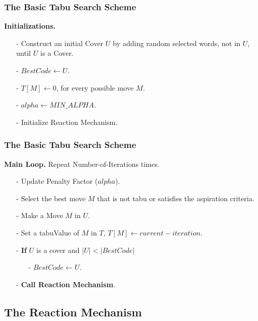 \documentclass{beamer}
\begin{document}
\begin{frame}
  \frametitle{The Basic Tabu Search Scheme}
{
{\bf Initializations.}
\begin{itemize}
    \item[-] Construct an initial Cover $U$ by adding random selected words, not in $U$, until $U$ is a Cover.
    \item[-] $BestCode \leftarrow U$.
    \item[-] $T[M] \leftarrow 0$, for every possible move $M$.
    \item[-] $alpha \leftarrow MIN\_ALPHA$.
    \item[-] Initialize Reaction Mechanism.
\end{itemize}	
}
\end{frame}


\begin{frame}
  \frametitle{The Basic Tabu Search Scheme}
{
{\bf Main Loop.} Repeat {\sc Number-of-Iterations} times.
\begin{itemize}
    \item[-] Update Penalty Factor ($alpha$).
    \item[-] Select the best move $M$ that is not tabu or satisfies the aspiration criteria.
    \item[-] Make a Move $M$ in $U$.
    \item[-] Set a tabuValue of $M$ in $T$, $T[M]  \leftarrow current-iteration$.
    \item[-] \textbf{If} $U$ is a cover and $|U| < |BestCode|$
        \begin{itemize}
        \item[-] $BestCode \leftarrow U$.
        \end{itemize}
    \item[-] {\bf Call Reaction Mechanism}.
\end{itemize}
}
\end{frame}

\subsection{The Reaction Mechanism}
\end{document}
